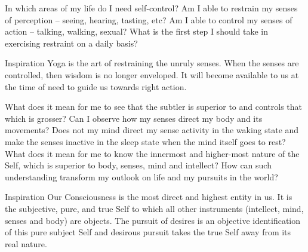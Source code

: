 \newpage
\begin{mananam}{} 
\mananamtext In which areas of my life do I need self-control? Am I able to restrain my senses of perception – seeing, hearing, tasting, etc? Am I able to control my senses of action – talking, walking, sexual? What is the first step I should take in exercising restraint on a daily basis?
\end{mananam}
\WritingHand{}
\begin{inspiration}{\mananamfont Inspiration}
\mananamtext Yoga is the art of restraining the unruly senses. When the senses are controlled, then wisdom is no longer enveloped. It will become available to us at the time of need to guide us towards right action.
\end{inspiration}
\newpage



\newpage
\begin{mananam}{} 
\mananamtext What does it mean for me to see that the subtler is superior to and controls that which is grosser? Can I observe how my senses direct my body and its movements? Does not my mind direct my sense activity in the waking state and make the senses inactive in the sleep state when the mind itself goes to rest? \\ 
What does it mean for me to know the innermost and higher-most nature of the Self, which is superior to body, senses, mind and intellect? How can such understanding transform my outlook on life and my pursuits in the world? 
\end{mananam}
\WritingHand{}
\begin{inspiration}{\mananamfont Inspiration}
\mananamtext Our Consciousness is the most direct and highest entity in us. It is the subjective, pure, and true Self to which all other instruments (intellect, mind, senses and body) are objects. The pursuit of desires is an objective identification of this pure subject Self and desirous pursuit takes the true Self away from its real nature.
\end{inspiration}
\newpage

